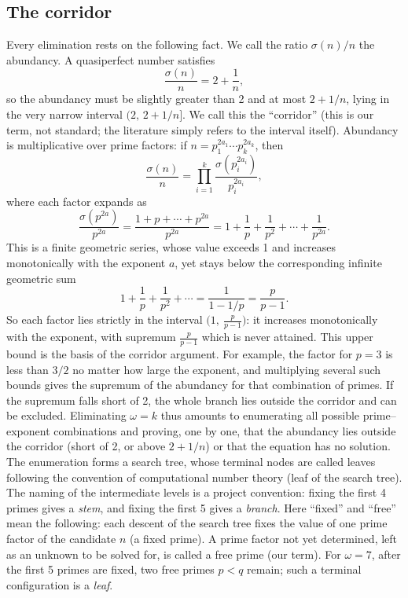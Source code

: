\documentclass[11pt]{article}
\theoremstyle{remark}
\begin{document}
\subsection{The corridor}\label{sec:corridor}

Every elimination rests on the following fact. We call the ratio $\sigma(n)/n$ the abundancy. A quasiperfect number satisfies
\[ \frac{\sigma(n)}{n} = 2 + \frac{1}{n},
\] so the abundancy must be slightly greater than 2 and at most $2 + 1/n$, lying in the very narrow interval $(2,\, 2 + 1/n]$. We call this the ``corridor'' (this is our term, not standard; the literature simply refers to the interval itself). Abundancy is multiplicative over prime factors: if $n = p_1^{2a_1} \cdots p_k^{2a_k}$, then
\[ \frac{\sigma(n)}{n} = \prod_{i=1}^{k} \frac{\sigma(p_i^{2a_i})}{p_i^{2a_i}},
\] where each factor expands as
\[ \frac{\sigma(p^{2a})}{p^{2a}} = \frac{1 + p + \cdots + p^{2a}}{p^{2a}} = 1 + \frac{1}{p} + \frac{1}{p^2} + \cdots + \frac{1}{p^{2a}}.
\] This is a finite geometric series, whose value exceeds 1 and increases monotonically with the exponent $a$, yet stays below the corresponding infinite geometric sum
\[ 1 + \frac{1}{p} + \frac{1}{p^2} + \cdots = \frac{1}{1 - 1/p} = \frac{p}{p - 1}.
\] So each factor lies strictly in the interval $\bigl(1,\ \frac{p}{p-1}\bigr)$: it increases monotonically with the exponent, with supremum $\frac{p}{p-1}$ which is never attained. This upper bound is the basis of the corridor argument. For example, the factor for $p = 3$ is less than $3/2$ no matter how large the exponent, and multiplying several such bounds gives the supremum of the abundancy for that combination of primes. If the supremum falls short of 2, the whole branch lies outside the corridor and can be excluded. Eliminating $\omega = k$ thus amounts to enumerating all possible prime--exponent combinations and proving, one by one, that the abundancy lies outside the corridor (short of 2, or above $2 + 1/n$) or that the equation has no solution. The enumeration forms a search tree, whose terminal nodes are called leaves following the convention of computational number theory (leaf of the search tree). The naming of the intermediate levels is a project convention: fixing the first 4 primes gives a \emph{stem}, and fixing the first 5 gives a \emph{branch}. Here ``fixed'' and ``free'' mean the following: each descent of the search tree fixes the value of one prime factor of the candidate $n$ (a fixed prime). A prime factor not yet determined, left as an unknown to be solved for, is called a free prime (our term). For $\omega = 7$, after the first 5 primes are fixed, two free primes $p < q$ remain; such a terminal configuration is a \emph{leaf}.
\end{document}

